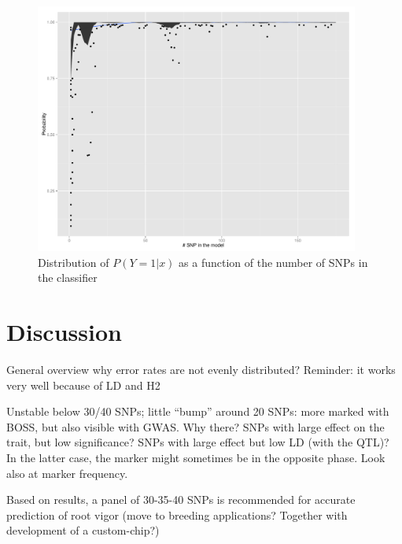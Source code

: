\begin{figure}
\includegraphics[width=0.95\textwidth]{probabilities.pdf}
\caption{Distribution of $P(Y=1|x)$ as a function of the number of SNPs
  in the classifier}
\label{fig:probability} 
\end{figure}


\section{Discussion}
\label{sec:discussion}
General overview
why error rates are not evenly distributed?
Reminder: it works very well because of LD and H2

Unstable below 30/40 SNPs; little ``bump'' around 20 SNPs: more marked
with BOSS, but also visible with GWAS. Why there? SNPs with large effect
on the trait, but low significance? SNPs with large effect but low LD
(with the QTL)? In the latter case, the marker might sometimes be in the
opposite phase. Look also at marker frequency.

Based on results, a panel of 30-35-40 SNPs is recommended for accurate
prediction of root vigor (move to breeding applications? Together with
development of a custom-chip?)

